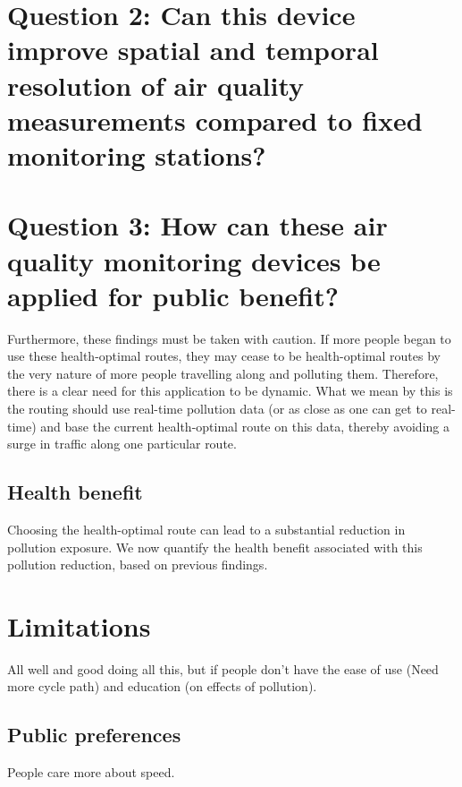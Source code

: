 \documentclass[11pt]{report}
\begin{document}
\section{Question 2: Can this device improve spatial and temporal resolution of air quality measurements compared to fixed monitoring stations?}

\section{Question 3: How can these air quality monitoring devices be applied for public benefit?}

Furthermore, these findings must be taken with caution. If more people began to use these health-optimal routes, they may cease to be health-optimal routes by the very nature of more people travelling along and polluting them. Therefore, there is a clear need for this application to be dynamic. What we mean by this is the routing should use real-time pollution data (or as close as one can get to real-time) and base the current health-optimal route on this data, thereby avoiding a surge in traffic along one particular route.

\subsection{Health benefit}


Choosing the health-optimal route can lead to a substantial reduction in pollution exposure. We now quantify the health benefit associated with this pollution reduction, based on previous findings.


\section{Limitations} \label{limitations}

All well and good doing all this, but if people don't have the ease of use (Need more cycle path) and education (on effects of pollution).

\subsection{Public preferences}

People care more about speed.
\end{document}
